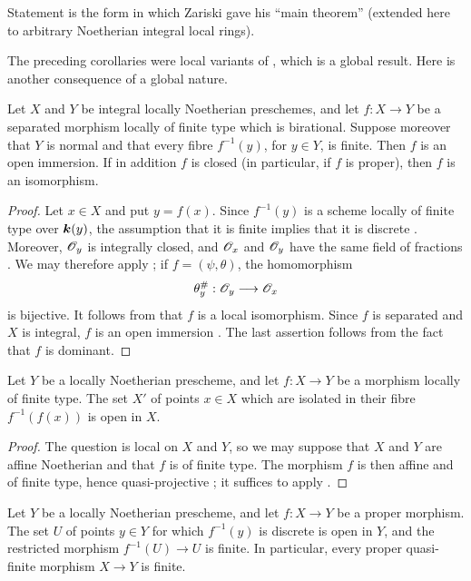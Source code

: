 Statement  is the form in which Zariski gave his
``main theorem'' (extended here to arbitrary Noetherian integral
local rings).

The preceding corollaries were local variants of
, which is a global result.  Here is another
consequence of a global nature.

\begin{corollary}[4.4.9]
\label{III.4.4.9}
Let $X$ and $Y$ be integral locally Noetherian preschemes, and let
$f:X\to Y$ be a separated morphism locally of finite type which is
birational.  Suppose moreover that $Y$ is normal and that every
fibre $f^{-1}(y)$, for $y\in Y$, is finite.  Then $f$ is an open
immersion.  If in addition $f$ is closed (in particular, if $f$ is
proper), then $f$ is an isomorphism.
\end{corollary}

\begin{proof}
Let $x\in X$ and put $y=f(x)$.  Since $f^{-1}(y)$ is a scheme
locally of finite type over $\boldsymbol{k}(y)$, the assumption that it is finite implies
that it is discrete .  Moreover, $\mathscr{O}_y$ is
integrally closed, and $\mathscr{O}_x$ and $\mathscr{O}_y$ have the same field
of fractions .  We may therefore apply
; if $f=(\psi,\theta)$, the homomorphism
\[
  \theta_y^\#:\mathscr{O}_y\longrightarrow\mathscr{O}_x
\]
is bijective.  It follows from  that $f$ is a local
isomorphism.  Since $f$ is separated and $X$ is integral, $f$ is an
open immersion .  The last assertion follows from
the fact that $f$ is dominant.
\end{proof}

\begin{proposition}[4.4.10]
\label{III.4.4.10}
Let $Y$ be a locally Noetherian prescheme, and let $f:X\to Y$ be a
morphism locally of finite type.  The set $X'$ of points $x\in X$
which are isolated in their fibre $f^{-1}(f(x))$ is open in $X$.
\end{proposition}

\begin{proof}
The question is local on $X$ and $Y$, so we may suppose that $X$ and
$Y$ are affine Noetherian and that $f$ is of finite type.  The
morphism $f$ is then affine and of finite type, hence quasi-projective
; it suffices to apply .
\end{proof}


\begin{corollary}[4.4.11]
\label{III.4.4.11}
Let $Y$ be a locally Noetherian prescheme, and let $f:X\to Y$ be a
proper morphism.  The set $U$ of points $y\in Y$ for which
$f^{-1}(y)$ is discrete is open in $Y$, and the restricted morphism
$f^{-1}(U)\to U$ is finite.  In particular, every proper
quasi-finite morphism $X\to Y$ is finite.
\end{corollary}

